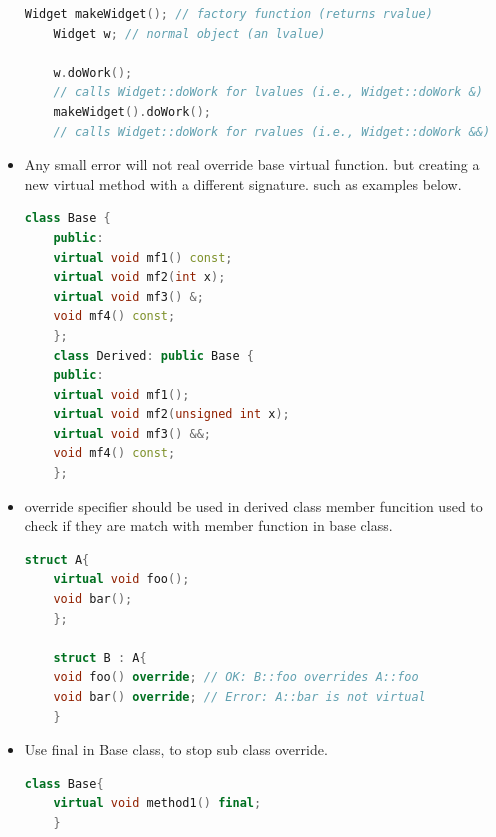 \documentclass[a4paper,12pt,twoside]{book}
\begin{document}
\begin{itemize}
\begin{lstlisting}[frame=single, language=c++]
	Widget makeWidget(); // factory function (returns rvalue)
	Widget w; // normal object (an lvalue)
	
	w.doWork();
	// calls Widget::doWork for lvalues (i.e., Widget::doWork &)
	makeWidget().doWork();
	// calls Widget::doWork for rvalues (i.e., Widget::doWork &&)
	\end{lstlisting}
	
	\item Any small error will not real override base virtual function. but creating a new virtual method with a different signature. such as examples below.
	\begin{lstlisting}[frame=single, language=c++]
	class Base {
	public:
	virtual void mf1() const;
	virtual void mf2(int x);
	virtual void mf3() &;
	void mf4() const;
	};
	class Derived: public Base {
	public:
	virtual void mf1();
	virtual void mf2(unsigned int x);
	virtual void mf3() &&;
	void mf4() const;
	};
	\end{lstlisting}
	
	\item override specifier should be used in derived class member funcition used to check if they are match with member function in base class.
	\begin{lstlisting}[frame=single, language=c++]
	struct A{
	virtual void foo();
	void bar();
	};
	
	struct B : A{
	void foo() override; // OK: B::foo overrides A::foo
	void bar() override; // Error: A::bar is not virtual
	}
	\end{lstlisting}
	
	\item Use final in Base class, to stop sub class override.
	\begin{lstlisting}[frame=single, language=c++, mathescape=true]
	class Base{
	virtual void method1() final;
	}
	\end{lstlisting}
	
	
	
\end{itemize}
\end{document}
